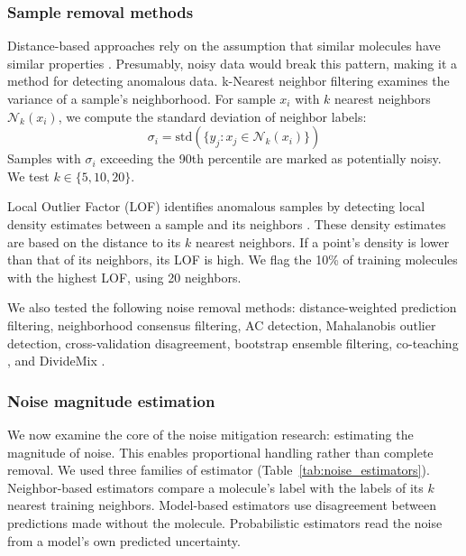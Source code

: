 \subsubsection{Sample removal methods}

Distance-based approaches rely on the assumption that similar molecules have similar properties \citep{Cherkasov2014}. Presumably, noisy data would break this pattern, making it a method for detecting anomalous data. k-Nearest neighbor filtering examines the variance of a sample's neighborhood. For sample $x_i$ with $k$ nearest neighbors $\mathcal{N}_k(x_i)$, we compute the standard deviation of neighbor labels:
\begin{equation}
\sigma_i = \text{std}(\{y_j : x_j \in \mathcal{N}_k(x_i)\})
\end{equation}
Samples with $\sigma_i$ exceeding the 90th percentile are marked as potentially noisy. We test $k \in \{5, 10, 20\}$.

Local Outlier Factor (LOF) identifies anomalous samples by detecting local density estimates between a sample and its neighbors \citep{Breunig2000}. These density estimates are based on the distance to its $k$ nearest neighbors. If a point's density is lower than that of its neighbors, its LOF is high. We flag the 10\% of training molecules with the highest LOF, using 20 neighbors. %

We also tested the following noise removal methods:  distance-weighted prediction filtering, neighborhood consensus filtering, AC detection, Mahalanobis outlier detection, cross-validation disagreement, bootstrap ensemble filtering, co-teaching \citep{Han2018}, and DivideMix \citep{li2020}.

\subsubsection{Noise magnitude estimation}

We now examine the core of the noise mitigation research: estimating the magnitude of noise. This enables proportional handling rather than complete removal. We used three families of estimator (Table~\ref{tab:noise_estimators}). Neighbor-based estimators compare a molecule's label with the labels of its $k$ nearest training neighbors. Model-based estimators use disagreement between predictions made without the molecule. Probabilistic estimators read the noise from a model's own predicted uncertainty.

